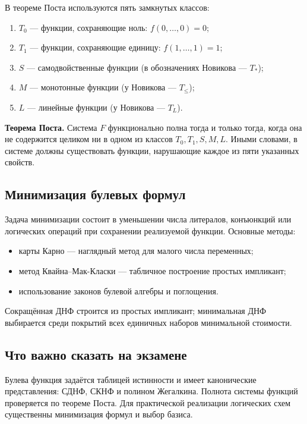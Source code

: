 В теореме Поста используются пять замкнутых классов:
\begin{enumerate}
    \item $T_0$ --- функции, сохраняющие ноль: $f(0,\ldots,0)=0$;
    \item $T_1$ --- функции, сохраняющие единицу: $f(1,\ldots,1)=1$;
    \item $S$ --- самодвойственные функции (в обозначениях Новикова --- $T_*$);
    \item $M$ --- монотонные функции (у Новикова --- $T_{\leq}$);
    \item $L$ --- линейные функции (у Новикова --- $T_L$).
\end{enumerate}

\textbf{Теорема Поста.}
Система $F$ функционально полна тогда и только тогда, когда она не содержится
целиком ни в одном из классов $T_0,T_1,S,M,L$. Иными словами, в системе должны
существовать функции, нарушающие каждое из пяти указанных свойств.

\subsection{Минимизация булевых формул}

Задача минимизации состоит в уменьшении числа литералов, конъюнкций или логических
операций при сохранении реализуемой функции. Основные методы:
\begin{itemize}
    \item карты Карно --- наглядный метод для малого числа переменных;
    \item метод Квайна--Мак-Класки --- табличное построение простых импликант;
    \item использование законов булевой алгебры и поглощения.
\end{itemize}

Сокращённая ДНФ строится из простых импликант; минимальная ДНФ выбирается среди
покрытий всех единичных наборов минимальной стоимости.

\subsection{Что важно сказать на экзамене}

Булева функция задаётся таблицей истинности и имеет канонические представления:
СДНФ, СКНФ и полином Жегалкина. Полнота системы функций проверяется по теореме
Поста. Для практической реализации логических схем существенны минимизация формул
и выбор базиса.

\newpage